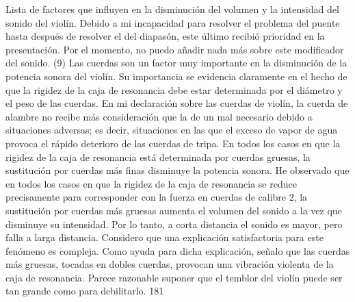 Lista de factores que influyen en la disminución del volumen y la intensidad del sonido del violín. Debido a mi incapacidad para resolver el problema del puente hasta después de resolver el del diapasón, este último recibió prioridad en la presentación. Por el momento, no puedo añadir nada más sobre este modificador del sonido.
(9) Las cuerdas son un factor muy importante en la disminución de la potencia sonora del violín. Su importancia se evidencia claramente en el hecho de que la rigidez de la caja de resonancia debe estar determinada por el diámetro y el peso de las cuerdas. En mi declaración sobre las cuerdas de violín, la cuerda de alambre no recibe más consideración que la de un mal necesario debido a situaciones adversas; es decir, situaciones en las que el exceso de vapor de agua provoca el rápido deterioro de las cuerdas de tripa. En todos los casos en que la rigidez de la caja de resonancia está determinada por cuerdas gruesas, la sustitución por cuerdas más finas disminuye la potencia sonora. He observado que en todos los casos en que la rigidez de la caja de resonancia se reduce precisamente para corresponder con la fuerza en cuerdas de calibre 2, la sustitución por cuerdas más gruesas aumenta el volumen del sonido a la vez que disminuye su intensidad. Por lo tanto, a corta distancia el sonido es mayor, pero falla a larga distancia. Considero que una explicación satisfactoria para este fenómeno es compleja. Como ayuda para dicha explicación, señalo que las cuerdas más gruesas, tocadas en dobles cuerdas, provocan una vibración violenta de la caja de resonancia. Parece razonable suponer que el temblor del violín puede ser tan grande como para debilitarlo.
181

